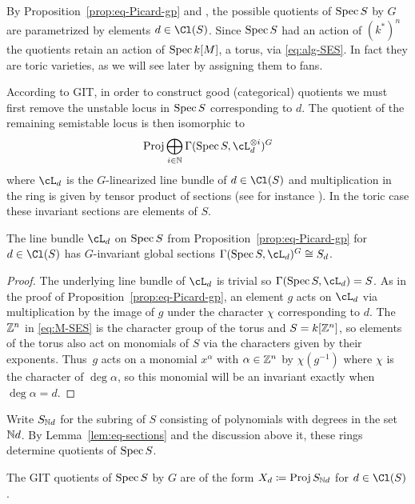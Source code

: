\documentclass{article}
\begin{document}
By Proposition~\ref{prop:eq-Picard-gp} and \cite[Converse~1.13]{Mumford1965}, the possible quotients of $\operatorname{Spec} S$ by $G$ are parametrized by elements $d\in\Cl(S)$.  Since $\operatorname{Spec} S$ had an action of $(k^*)^n$ the quotients retain an action of $\operatorname{Spec} k[M]$, a torus, via \eqref{eq:alg-SES}.  In fact they are toric varieties, as we will see later by assigning them to fans.

According to GIT, in order to construct good (categorical) quotients we must first remove the unstable locus in $\operatorname{Spec} S$ corresponding to $d$.  The quotient of the remaining semistable locus is then isomorphic to
\[\Proj\bigoplus_{i\in\NN}\Gamma(\Spec S,\cL_d^{\otimes i})^G\]
where $\cL_d$ is the $G$-linearized line bundle of $d\in\Cl(S)$ and multiplication in the ring is given by tensor product of sections (see for instance \cite[Proposition~8.1]{Dolgachev2003}).  In the toric case these invariant sections are elements of $S$.

\begin{lemma}\label{lem:eq-sections}
  The line bundle $\cL_d$ on $\operatorname{Spec} S$ from Proposition~\ref{prop:eq-Picard-gp} for $d\in\Cl(S)$ has $G$-invariant global sections $\Gamma(\Spec S,\cL_d)^G\cong S_d$.
\end{lemma}

\begin{proof}
  The underlying line bundle of $\cL_d$ is trivial so $\Gamma(\Spec S,\cL_d)=S$.  As in the proof of Proposition~\ref{prop:eq-Picard-gp}, an element $g$ acts on $\cL_d$ via multiplication by the image of $g$ under the character $\chi$ corresponding to $d$.  The $\mathbb Z^n$ in \eqref{eq:M-SES} is the character group of the torus and $S=k[\mathbb Z^n]$, so elements of the torus also act on monomials of $S$ via the characters given by their exponents.  Thus~$g$ acts on a monomial $x^\alpha$ with $\alpha\in\mathbb Z^n$ by $\chi(g^{-1})$ where $\chi$ is the character of $\deg\alpha$, so this monomial will be an invariant exactly when $\deg\alpha=d$.
\end{proof}

Write $S_{\mathbb N d}$ for the subring of $S$ consisting of polynomials with degrees in the set $\mathbb N d$.  By Lemma~\ref{lem:eq-sections} and the discussion above it, these rings determine quotients of $\operatorname{Spec} S$.

\begin{cor}\label{cor:quotient-Proj}
  The GIT quotients of $\operatorname{Spec} S$ by $G$ are of the form $X_d\coloneqq\operatorname{Proj} S_{\mathbb N d}$ for $d\in\Cl(S)$.
\end{cor}
\end{document}
